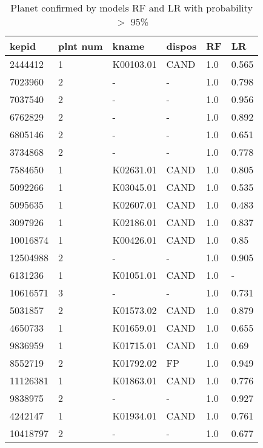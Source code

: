 \begin{table}[!htbp]
 \centering
 \caption{Planet confirmed by models RF and LR with probability $>$ 95\%}
 \label{dataRFLRcreftab} 
  \begin{tabular}
{| 
 p{}| 
 p{}| 
 p{}| 
 p{}| 
 p{}| 
 p{}| 
}\hline 
\textbf{kepid} &\textbf{plnt num} &\textbf{kname} &\textbf{dispos} &\textbf{RF} &\textbf{LR} \\ \hline 
2444412 &1 &K00103.01 &CAND &1.0 &0.565 \\ \hline 
7023960 &2 &- &- &1.0 &0.798 \\ \hline 
7037540 &2 &- &- &1.0 &0.956 \\ \hline 
6762829 &2 &- &- &1.0 &0.892 \\ \hline 
6805146 &2 &- &- &1.0 &0.651 \\ \hline 
3734868 &2 &- &- &1.0 &0.778 \\ \hline 
7584650 &1 &K02631.01 &CAND &1.0 &0.805 \\ \hline 
5092266 &1 &K03045.01 &CAND &1.0 &0.535 \\ \hline 
5095635 &1 &K02607.01 &CAND &1.0 &0.483 \\ \hline 
3097926 &1 &K02186.01 &CAND &1.0 &0.837 \\ \hline 
10016874 &1 &K00426.01 &CAND &1.0 &0.85 \\ \hline 
12504988 &2 &- &- &1.0 &0.905 \\ \hline 
6131236 &1 &K01051.01 &CAND &1.0 &- \\ \hline 
10616571 &3 &- &- &1.0 &0.731 \\ \hline 
5031857 &2 &K01573.02 &CAND &1.0 &0.879 \\ \hline 
4650733 &1 &K01659.01 &CAND &1.0 &0.655 \\ \hline 
9836959 &1 &K01715.01 &CAND &1.0 &0.69 \\ \hline 
8552719 &2 &K01792.02 &FP &1.0 &0.949 \\ \hline 
11126381 &1 &K01863.01 &CAND &1.0 &0.776 \\ \hline 
9838975 &2 &- &- &1.0 &0.927 \\ \hline 
4242147 &1 &K01934.01 &CAND &1.0 &0.761 \\ \hline 
10418797 &2 &- &- &1.0 &0.677 \\ \hline 

\end{tabular}
\end{table}
